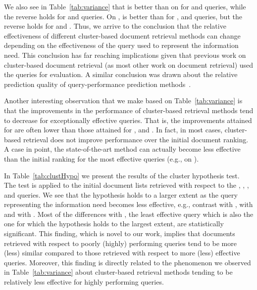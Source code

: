 
We also see in Table~\ref{tab:variance} that \clustMRF is better than
\interp on \robust for \titleQuery and \qOneAP queries, while the
reverse holds for \medAP and \maxAP queries. On \cw, \clustMRF is
better than \geoClust for \titleQuery, \qOneAP and \medAP queries, but
the reverse holds for \qThreeAP and \maxAP. Thus, we arrive to the conclusion that the relative effectiveness of
different cluster-based document retrieval methods can change depending on the
effectiveness of the query used to represent the information need. This conclusion has far reaching implications given that previous work on cluster-based document retrieval (as most other work on document retrieval) used the \titleQuery queries for evaluation.
A similar conclusion was drawn about the
relative prediction quality of query-performance prediction
methods~\cite{Zendel+al:19a}. 

Another interesting observation that we make based on Table~\ref{tab:variance} is that the improvements in the performance of cluster-based retrieval methods tend to decrease for exceptionally effective queries.
That is, the improvements attained for \maxAP are often lower than those attained for \qOneAP, \medAP and \qThreeAP. In fact, in most cases, cluster-based retrieval does not improve performance over the initial document ranking.
A case in point, the state-of-the-art method \clustMRF can actually become less effective than the initial ranking for the most effective queries (e.g., \maxAP on \robust).


In Table~\ref{tab:clustHypo} we present the results of the cluster hypothesis test. The test is applied to the initial document lists retrieved with respect to the \titleQuery, \qOneAP, \medAP, \qThreeAP and \maxAP queries. We see that the hypothesis holds to a larger extent as the query representing the information need becomes less effective, e.g., contrast \qOneAP with \medAP, \medAP with \qThreeAP and \qThreeAP with \maxAP.  Most of the differences with \qOneAP, the least effective query which is also the one for which the hypothesis holds to the largest extent, are statistically significant. This finding, which is novel to our work, implies that documents retrieved with respect to poorly (highly) performing queries tend to be more (less) similar compared to those retrieved with respect to more (less) effective queries.
Moreover, this finding is directly related to the phenomenon we observed in Table~\ref{tab:variance} about cluster-based retrieval methods tending to be relatively less effective for highly performing queries.


